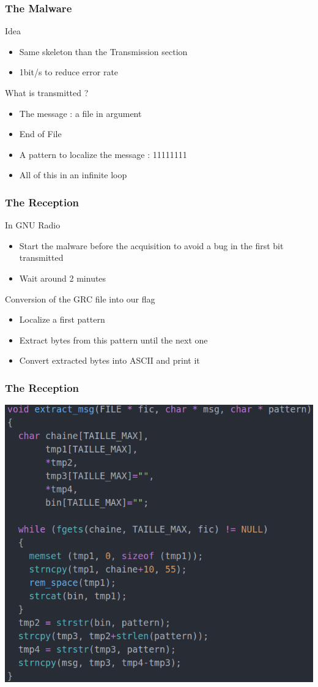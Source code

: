 \begin{frame}
\frametitle{The Malware}
\begin{block}{Idea}
\begin{itemize}
\item Same skeleton than the Transmission section
\item 1bit/s to reduce error rate
\end{itemize}
\end{block}
\begin{block}{What is transmitted ?}
\begin{itemize}
\item The message : a file in argument
\item End of File
\item A pattern to localize the message : 11111111
\item All of this in an infinite loop
\end{itemize}
\end{block}
\end{frame}

\begin{frame}
\frametitle{The Reception}
\begin{block}{In GNU Radio}
\begin{itemize}
\item Start the malware before the acquisition to avoid a bug in the first bit transmitted
\item Wait around 2 minutes
\end{itemize}
\end{block}
\begin{block}{Conversion of the GRC file into our flag}
\begin{itemize}
\item Localize a first pattern
\item Extract bytes from this pattern until the next one
\item Convert extracted bytes into ASCII and print it
\end{itemize}
\end{block}
\end{frame}

\begin{frame}
\frametitle{The Reception}
\centering \includegraphics[scale=0.38]{images/extract_message.png}
\end{frame}